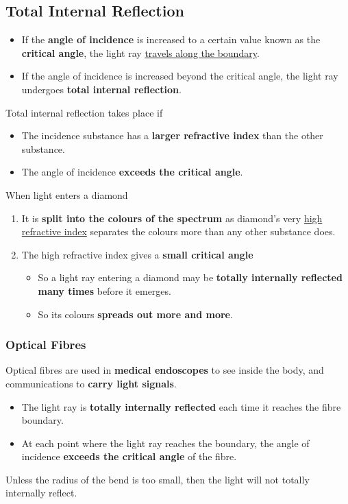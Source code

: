 \subsection{Total Internal Reflection}
\begin{itemize}
    \item If the \textbf{angle of incidence} is increased to a certain value known as the \textbf{critical angle}, the light ray \underline{travels along the boundary}.
    \item If the angle of incidence is increased beyond the critical angle, the light ray undergoes \textbf{total internal reflection}.
\end{itemize}
Total internal reflection takes place if
\begin{itemize}
    \item The incidence substance has a \textbf{larger refractive index} than the other substance.
    \item The angle of incidence \textbf{exceeds the critical angle}.
\end{itemize}

When light enters a diamond
\begin{enumerate}
    \item It is \textbf{split into the colours of the spectrum} as diamond's very \underline{high refractive index} separates the colours more than any other substance does.
    \item The high refractive index gives a \textbf{small critical angle}
        \begin{itemize}
            \item So a light ray entering a diamond may be \textbf{totally internally reflected many times} before it emerges.
            \item So its colours \textbf{spreads out more and more}.
        \end{itemize}
\end{enumerate}

\subsubsection*{Optical Fibres}
Optical fibres are used in \textbf{medical endoscopes} to see inside the body, and communications to \textbf{carry light signals}.
\begin{itemize}
    \item The light ray is \textbf{totally internally reflected} each time it reaches the fibre boundary.
    \item At each point where the light ray reaches the boundary, the angle of incidence \textbf{exceeds the critical angle} of the fibre.
\end{itemize}
Unless the radius of the bend is too small, then the light will not totally internally reflect.

